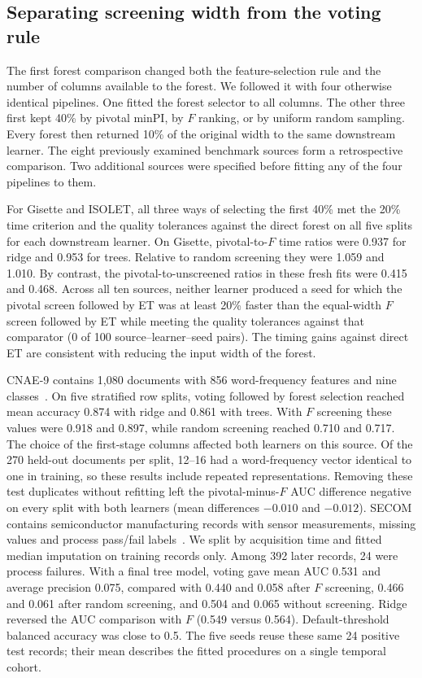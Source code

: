 \subsection{Separating screening width from the voting rule}
The first forest comparison changed both the feature-selection rule and the number of columns available to the forest. We followed it with four otherwise identical pipelines. One fitted the forest selector to all columns. The other three first kept 40\% by pivotal minPI, by $F$ ranking, or by uniform random sampling. Every forest then returned 10\% of the original width to the same downstream learner. The eight previously examined benchmark sources form a retrospective comparison. Two additional sources were specified before fitting any of the four pipelines to them.

For Gisette and ISOLET, all three ways of selecting the first 40\% met the 20\% time criterion and the quality tolerances against the direct forest on all five splits for each downstream learner. On Gisette, pivotal-to-$F$ time ratios were 0.937 for ridge and 0.953 for trees. Relative to random screening they were 1.059 and 1.010. By contrast, the pivotal-to-unscreened ratios in these fresh fits were 0.415 and 0.468. Across all ten sources, neither learner produced a seed for which the pivotal screen followed by ET was at least 20\% faster than the equal-width $F$ screen followed by ET while meeting the quality tolerances against that comparator (0 of 100 source--learner--seed pairs). The timing gains against direct ET are consistent with reducing the input width of the forest.

CNAE-9 contains 1,080 documents with 856 word-frequency features and nine classes~\citep{ciarelli2009cnae}. On five stratified row splits, voting followed by forest selection reached mean accuracy 0.874 with ridge and 0.861 with trees. With $F$ screening these values were 0.918 and 0.897, while random screening reached 0.710 and 0.717. The choice of the first-stage columns affected both learners on this source. Of the 270 held-out documents per split, 12--16 had a word-frequency vector identical to one in training, so these results include repeated representations. Removing these test duplicates without refitting left the pivotal-minus-$F$ AUC difference negative on every split with both learners (mean differences $-0.010$ and $-0.012$). SECOM contains semiconductor manufacturing records with sensor measurements, missing values and process pass/fail labels~\citep{mccann2008secom}. We split by acquisition time and fitted median imputation on training records only. Among 392 later records, 24 were process failures. With a final tree model, voting gave mean AUC 0.531 and average precision 0.075, compared with 0.440 and 0.058 after $F$ screening, 0.466 and 0.061 after random screening, and 0.504 and 0.065 without screening. Ridge reversed the AUC comparison with $F$ (0.549 versus 0.564). Default-threshold balanced accuracy was close to 0.5. The five seeds reuse these same 24 positive test records; their mean describes the fitted procedures on a single temporal cohort.
